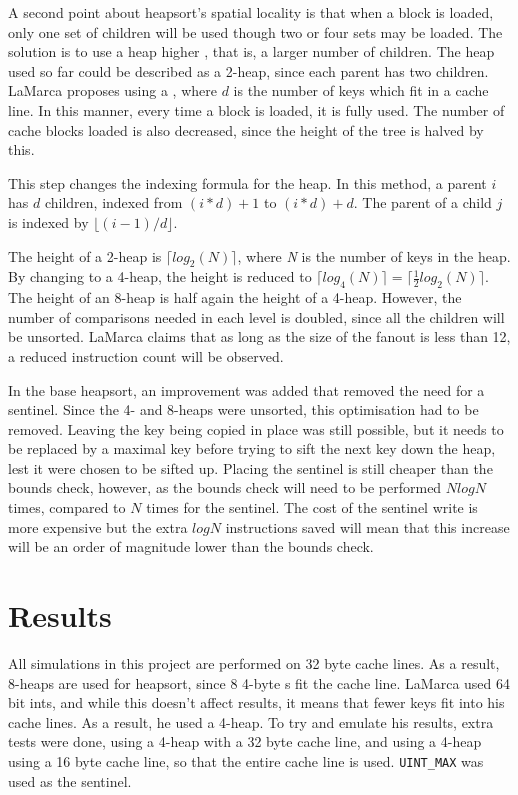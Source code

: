 A second point about heapsort's spatial locality is that when a block is loaded,
only one set of children will be used though two or four sets may be loaded. The
solution is to use a heap higher , that is, a larger number of
children.  The heap used so far could be described as a 2-heap, since each
parent has two children.  LaMarca proposes using a , where $d$ is the
number of keys which fit in a cache line. In this manner, every time a block is
loaded, it is fully used. The number of cache blocks loaded is also decreased,
since the height of the tree is halved by this.

This step changes the indexing formula for the heap. In this method, a parent
$i$ has $d$ children, indexed from $(i*d) + 1$ to $(i*d) + d$. The parent of a
child $j$ is indexed by $\lfloor{}(i-1)/d\rfloor{}$.

The height of a 2-heap is $\lceil{}log_2(N)\rceil{}$, where \textit{N} is the
number of keys in the heap. By changing to a 4-heap, the height is reduced to
$\lceil{}log_4(N)\rceil{} = \lceil{}\tfrac{1}{2}log_2(N)\rceil{}$. The height of
an 8-heap is half again the height of a 4-heap. However, the number of
comparisons needed in each level is doubled, since all the children will be
unsorted. LaMarca claims that as long as the size of the fanout is less than
12, a reduced instruction count will be observed.

In the base heapsort, an improvement was added that removed the need for a
sentinel. Since the 4- and 8-heaps were unsorted, this optimisation had to be
removed. Leaving the key being copied in place was still possible, but it needs
to be replaced by a maximal key before trying to sift the next key down the
heap, lest it were chosen to be sifted up. Placing the sentinel is still cheaper
than the bounds check, however, as the bounds check will need to be performed
$NlogN$ times, compared to $N$ times for the sentinel. The cost of the sentinel
write is more expensive but the extra $logN$ instructions saved will mean that
this increase will be an order of magnitude lower than the bounds check.

\section{Results}
All simulations in this project are performed on 32 byte cache lines. As a
result, 8-heaps are used for heapsort, since 8 4-byte s fit the cache line.
LaMarca used 64 bit ints, and while this doesn't affect results, it means that
fewer keys fit into his cache lines. As a result, he used a 4-heap. To try and
emulate his results, extra tests were done, using a 4-heap with a 32 byte
cache line, and using a 4-heap using a 16 byte cache line, so that the entire
cache line is used. \verb!UINT_MAX! was used as the sentinel.

